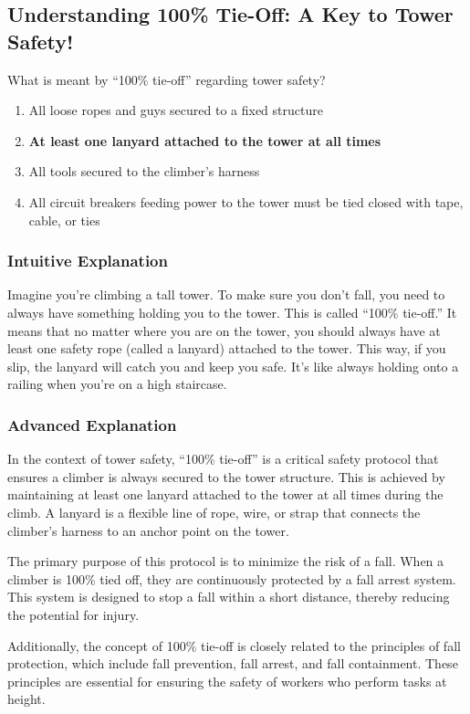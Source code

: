 \subsection{Understanding 100\% Tie-Off: A Key to Tower Safety!}

\begin{tcolorbox}[colback=gray!10!white,colframe=black!75!black,title=E0A07] What is meant by “100\% tie-off” regarding tower safety?
    \begin{enumerate}[label=\Alph*),noitemsep]
        \item All loose ropes and guys secured to a fixed structure
        \item \textbf{At least one lanyard attached to the tower at all times}
        \item All tools secured to the climber’s harness
        \item All circuit breakers feeding power to the tower must be tied closed with tape, cable, or ties
    \end{enumerate}
\end{tcolorbox}

\subsubsection{Intuitive Explanation}
Imagine you’re climbing a tall tower. To make sure you don’t fall, you need to always have something holding you to the tower. This is called “100\% tie-off.” It means that no matter where you are on the tower, you should always have at least one safety rope (called a lanyard) attached to the tower. This way, if you slip, the lanyard will catch you and keep you safe. It’s like always holding onto a railing when you’re on a high staircase.

\subsubsection{Advanced Explanation}
In the context of tower safety, “100\% tie-off” is a critical safety protocol that ensures a climber is always secured to the tower structure. This is achieved by maintaining at least one lanyard attached to the tower at all times during the climb. A lanyard is a flexible line of rope, wire, or strap that connects the climber’s harness to an anchor point on the tower. 

The primary purpose of this protocol is to minimize the risk of a fall. When a climber is 100\% tied off, they are continuously protected by a fall arrest system. This system is designed to stop a fall within a short distance, thereby reducing the potential for injury. 


Additionally, the concept of 100\% tie-off is closely related to the principles of fall protection, which include fall prevention, fall arrest, and fall containment. These principles are essential for ensuring the safety of workers who perform tasks at height.

